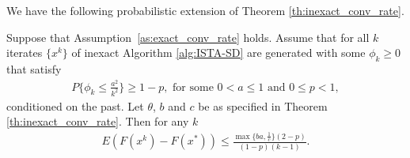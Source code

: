 \documentclass[11pt]{article}
\numberwithin{equation}{section}
\begin{document}
We have the following probabilistic extension of Theorem \ref{th:inexact_conv_rate}.

\begin{theorem}\label{th:inexact_random_conv_rate}
Suppose that Assumption~\ref{as:exact_conv_rate} holds. 
Assume that for all $k$ iterates $\{x^k\}$ of inexact Algorithm \ref{alg:ISTA-SD} are generated with some $\phi_k\geq 0$ that satisfy
\begin{align}
\label{equ:phi_conv_rate_required}
    P\{\phi_k \leq \frac{a^2}{k^2}\}\geq 1-p, \mbox{ for\ some\ } 0<a \leq 1 \mbox{ and }  0\leq p<1,
\end{align}
conditioned on the past. 
Let  $\theta$, $b$ and $c$ be as specified in Theorem \ref{th:inexact_conv_rate}. Then for any $k$
\begin{align}
    \label{eq:bound_F_F*}
	E(F(x^k) - F(x^*) )
    \leq \frac{\max\{ba, \frac{1}{c}\}(2-p)}{(1-p)(k-1)}. 
\end{align}
\end{theorem}
\end{document}

